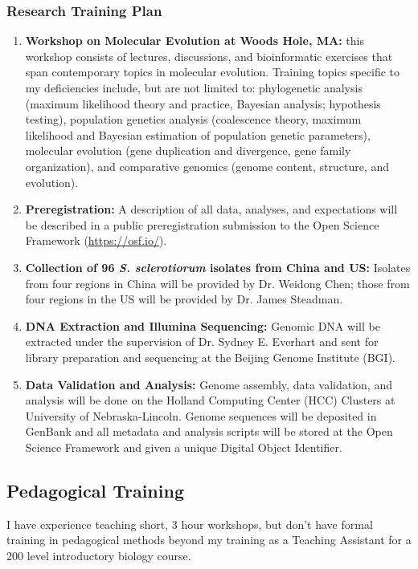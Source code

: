 \documentclass[12pt,letterpaper]{article}
\begin{document}
\subsubsection{Research Training Plan}

\begin{enumerate}
  \item \textbf{Workshop on Molecular Evolution at Woods Hole, MA:} this workshop consists of lectures, discussions, and bioinformatic exercises that span contemporary topics in molecular evolution. Training topics specific to my deficiencies include, but are not limited to: phylogenetic analysis (maximum likelihood theory and practice, Bayesian analysis; hypothesis testing), population genetics analysis (coalescence theory, maximum likelihood and Bayesian estimation of population genetic parameters), molecular evolution (gene duplication and divergence, gene family organization), and comparative genomics (genome content, structure, and evolution).
  \item \textbf{Preregistration:} A description of all data, analyses, and expectations will be described in a public preregistration submission to the Open Science Framework (\url{https://osf.io/}).
  \item \textbf{Collection of 96 \textit{S. sclerotiorum} isolates from China and US:} Isolates from four regions in China will be provided by Dr. Weidong Chen; those from four regions in the US will be provided by Dr. James Steadman. 
  \item \textbf{DNA Extraction and Illumina Sequencing:} Genomic DNA will be extracted under the supervision of Dr. Sydney E. Everhart and sent for library preparation and sequencing at the Beijing Genome Institute (BGI). 
  \item \textbf{Data Validation and Analysis:} Genome assembly, data validation,
  and analysis will be done on the Holland Computing Center (HCC) Clusters at University of Nebraska-Lincoln. Genome sequences will be deposited in GenBank and all metadata and analysis scripts will be stored at the Open Science Framework and given a unique Digital Object Identifier.
\end{enumerate}


\subsection{Pedagogical Training}

I have experience teaching short, 3 hour workshops, but don't have formal training in pedagogical methods beyond my training as a Teaching Assistant for a 200 level introductory biology course. 
\end{document}

